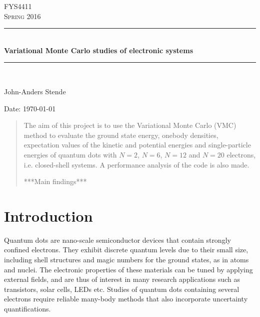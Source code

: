 \documentclass[english, a4paper]{article}
\begin{document}
\renewcommand{\figurename}{Figure}
\begin{titlepage}
\begin{center}

\textsc{\Large FYS4411}\\[0.5cm]
\textsc{\Large Spring 2016}\\[1.5cm]
\rule{\linewidth}{0.5mm} \\[0.4cm]
{ \huge \bfseries Variational Monte Carlo studies of electronic systems}\\[0.10cm]
\rule{\linewidth}{0.5mm} \\[1.5cm]

\begin{minipage}{0.49\textwidth}
    \begin{center} \large
        John-Anders Stende \\[0.8cm]
    \end{center}
\end{minipage}


\vfill

\large{Date: \today}

\end{center}
\end{titlepage}


\begin{abstract}
The aim of this project is to use the Variational Monte Carlo (VMC) method to evaluate the
ground state energy, onebody densities, expectation values of the kinetic and potential energies
and single-particle energies of quantum dots with $N=2$, $N=6$, $N=12$ and $N=20$ electrons,
i.e. closed-shell systems. A performance analysis of the code is also made.

***Main findings*** 


\end{abstract}

\tableofcontents


\section{Introduction}
\noindent Quantum dots are nano-scale semiconductor devices that contain strongly confined electrons. 
They exhibit discrete quantum levels due to their small size, including shell structures and magic
numbers for the ground states, as in atoms and nuclei. The electronic properties of these materials 
can be tuned by applying external fields, and are thus of interest in many research applications such as
transistors, solar cells, LEDs etc. Studies of quantum dots containing several electrons require
reliable many-body methods that also incorporate uncertainty quantifications.\\
\end{document}
